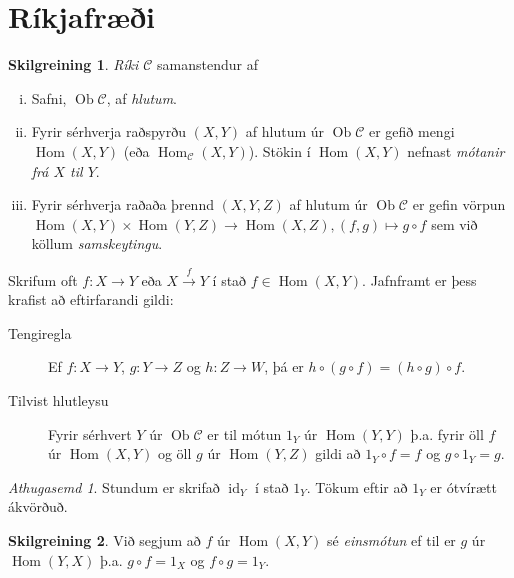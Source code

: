 \documentclass[a4paper,icelandic]{book}
\theoremstyle{definition}
\newtheorem{skilgr}{Skilgreining}[section]
\theoremstyle{plain}
\theoremstyle{remark}
\newtheorem*{ath}{Athugasemd}
\DeclareMathOperator{\id}{id} %
\DeclareMathOperator{\Ob}{Ob}
\DeclareMathOperator{\Hom}{Hom}
\begin{document}
\section{Ríkjafræði}

\begin{skilgr}
  \emph{Ríki $\mathcal C$} samanstendur af 
  \begin{enumerate}[(i)]
    \item Safni, $\Ob \mathcal C$, af \emph{hlutum}.
    \item Fyrir sérhverja raðspyrðu $(X,Y)$ af hlutum úr $\Ob \mathcal
      C$ er gefið mengi $\Hom(X,Y)$ (eða $\Hom_{\mathcal C}(X,Y)$).
      Stökin í $\Hom(X,Y)$ nefnast \emph{mótanir frá $X$ til $Y$}.
    \item Fyrir sérhverja raðaða þrennd $(X,Y,Z)$ af hlutum úr $\Ob
      \mathcal C$ er gefin vörpun $\Hom(X,Y)\times\Hom(Y,Z)\to\Hom(X,Z),
      (f,g)\mapsto g\circ f$ sem við köllum
      \emph{samskeytingu}.
  \end{enumerate}
  Skrifum oft $f:X\to Y$ eða $X\xrightarrow{f} Y$ í stað
  $f\in\Hom(X,Y)$. Jafnframt er þess krafist að eftirfarandi gildi:
  \begin{description}
    \item[Tengiregla] Ef $f:X\to Y$, $g:Y\to Z$ og $h:Z\to W$, þá er
      $h\circ (g\circ f) = (h\circ g)\circ f$.
    \item[Tilvist hlutleysu] Fyrir sérhvert $Y$ úr $\Ob\mathcal C$ er
      til mótun $1_Y$ úr $\Hom(Y,Y)$ þ.a. fyrir öll $f$ úr $\Hom(X,Y)$
      og öll $g$ úr $\Hom(Y,Z)$ gildi að $1_Y\circ f = f$ og $g\circ 1_Y
      = g$.
  \end{description}
\end{skilgr}
\begin{ath}
  Stundum er skrifað $\id_Y$ í stað $1_Y$. Tökum eftir að $1_Y$ er
  ótvírætt ákvörðuð.
\end{ath}
\begin{skilgr}
  Við segjum að $f$ úr $\Hom(X,Y)$ sé \emph{einsmótun} ef til er $g$ úr $\Hom(Y,X)$ þ.a. $g\circ f = 1_X$ og
  $f\circ g = 1_Y$.
\end{skilgr}
\end{document}
